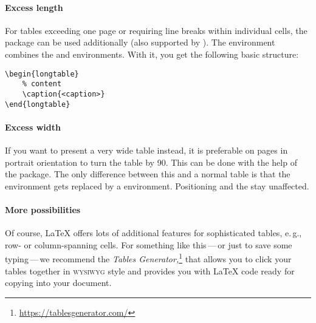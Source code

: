 \paragraph{Excess length}
For tables exceeding one page or requiring line breaks within individual cells,
the  package can be used additionally (also supported by ).
The  environment combines the  and  environments.
With it, you get the following basic structure:

\begin{samepage}
\begin{verbatim}
\begin{longtable}
    % content
    \caption{<caption>}
\end{longtable}
\end{verbatim}
\end{samepage}

\paragraph{Excess width}
If you want to present a very wide table instead, it is preferable on pages in portrait orientation to turn the table by 90\textdegree{}.
This can be done with the help of the  package.
The only difference between this and a normal table is that the  environment gets replaced by a  environment.
Positioning and the  stay unaffected.

\paragraph{More possibilities}
Of course, \LaTeX{} offers lots of additional features for sophisticated tables, e.\,g., row- or column-spanning cells.
For something like this\,---\,or just to save some typing\,---\,we recommend the \emph{Tables Generator}\textit{,}\footnote{\url{https://tablesgenerator.com/}} that allows you to click your tables together in \textsc{wysiwyg} style and provides you with \LaTeX{} code ready for copying into your document.


